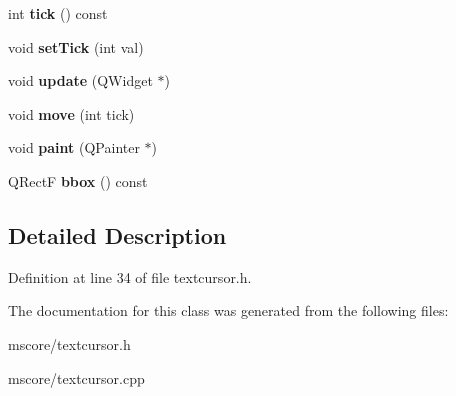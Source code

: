 \begin{DoxyCompactItemize}
\item 
\mbox{\label{class_ms_1_1_position_cursor_aa5e4d6c6c6e97ca46e4f293278ef9166}} 
int {\bfseries tick} () const
\item 
\mbox{\label{class_ms_1_1_position_cursor_aeff54ab2f5d098bdafae29f40db2cb48}} 
void {\bfseries set\+Tick} (int val)
\item 
\mbox{\label{class_ms_1_1_position_cursor_a6f4d9b5ecbd8579ab3ccbfc5f24bf0c4}} 
void {\bfseries update} (Q\+Widget $\ast$)
\item 
\mbox{\label{class_ms_1_1_position_cursor_a7560cc61f82315fdb0011cd605492678}} 
void {\bfseries move} (int tick)
\item 
\mbox{\label{class_ms_1_1_position_cursor_aa85c4c67d2d59bb5478420c69d4fdcae}} 
void {\bfseries paint} (Q\+Painter $\ast$)
\item 
\mbox{\label{class_ms_1_1_position_cursor_ae5ea6a716c2fcf20164ca146ce4150b9}} 
Q\+RectF {\bfseries bbox} () const
\end{DoxyCompactItemize}


\subsection{Detailed Description}


Definition at line 34 of file textcursor.\+h.



The documentation for this class was generated from the following files\+:\begin{DoxyCompactItemize}
\item 
mscore/textcursor.\+h\item 
mscore/textcursor.\+cpp\end{DoxyCompactItemize}
